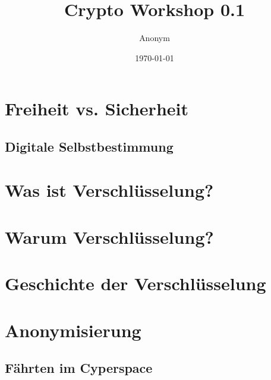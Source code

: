 \documentclass{beamer}
\begin{document}
\title{Crypto Workshop 0.1}   
\author{Anonym} 
\date{\today} 

\frame{\titlepage} 


\section{Freiheit vs. Sicherheit} 
\subsection{Digitale Selbstbestimmung} 

\section{Was ist Verschlüsselung?} 
\section{Warum Verschlüsselung?} 
\section{Geschichte der Verschlüsselung} 

\section{Anonymisierung} 
\subsection{Fährten im Cyperspace} 
\end{document}
